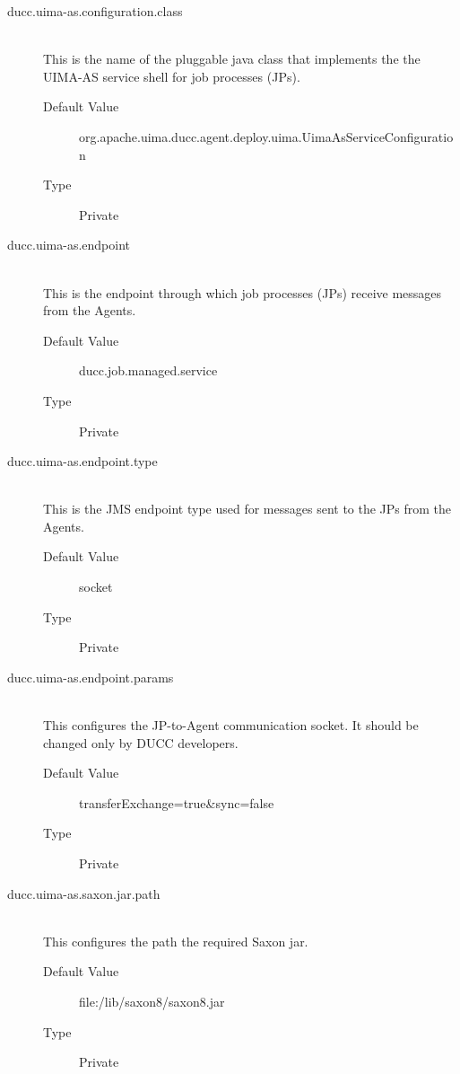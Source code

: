     \begin{description}

      \item[ducc.uima-as.configuration.class] \hfill \\
        This is the name of the pluggable java class that implements the the UIMA-AS service 
        shell for job processes (JPs). 
        \begin{description}
          \item[Default Value] org.apache.uima.ducc.agent.deploy.uima.UimaAsServiceConfiguration 
          \item[Type] Private 
        \end{description}
        
      \item[ducc.uima-as.endpoint] \hfill \\
        This is the endpoint through which job processes (JPs) receive messages from the Agents. 
        \begin{description}
          \item[Default Value] ducc.job.managed.service 
          \item[Type] Private 
        \end{description}
        
      \item[ducc.uima-as.endpoint.type] \hfill \\
        This is the JMS endpoint type used for messages sent to the JPs from the Agents. 
        \begin{description}
          \item[Default Value] socket 
          \item[Type] Private 
        \end{description}
        
      \item[ducc.uima-as.endpoint.params] \hfill \\
        This configures the JP-to-Agent communication socket. It should be changed only by 
        DUCC developers. 
        \begin{description}
          \item[Default Value] transferExchange=true\&sync=false 
          \item[Type] Private
        \end{description} 
        
      \item[ducc.uima-as.saxon.jar.path] \hfill \\
        This configures the path the required Saxon jar. 
        \begin{description}
          \item[Default Value] file:\ducchome/lib/saxon8/saxon8.jar 
          \item[Type] Private 
        \end{description}
        


\end{description}
